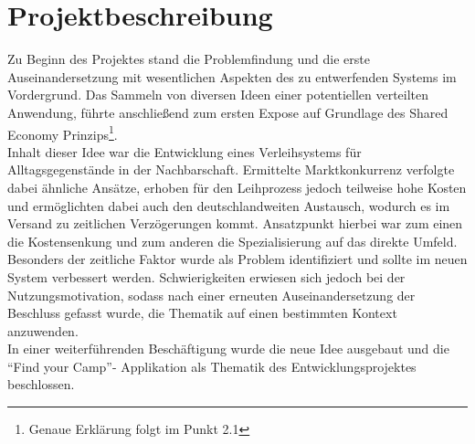
\chapter{Projektbeschreibung}

Zu Beginn des Projektes stand die Problemfindung und die erste Auseinandersetzung mit wesentlichen Aspekten des zu entwerfenden Systems im Vordergrund. Das Sammeln von diversen Ideen einer potentiellen verteilten Anwendung, führte anschließend zum ersten Expose auf Grundlage des Shared Economy Prinzips\footnote{Genaue Erklärung folgt im Punkt 2.1}.\\
Inhalt dieser Idee war die Entwicklung eines Verleihsystems für Alltagsgegenstände in der Nachbarschaft. Ermittelte Marktkonkurrenz verfolgte dabei ähnliche Ansätze, erhoben für den Leihprozess jedoch teilweise hohe Kosten und ermöglichten dabei auch den deutschlandweiten Austausch, wodurch es im Versand zu zeitlichen Verzögerungen kommt.
Ansatzpunkt hierbei war zum einen die Kostensenkung und zum anderen die Spezialisierung auf das direkte Umfeld. Besonders der zeitliche Faktor wurde als Problem identifiziert und sollte im neuen System verbessert werden. Schwierigkeiten erwiesen sich jedoch bei der Nutzungsmotivation, sodass nach einer erneuten Auseinandersetzung der Beschluss gefasst wurde, die Thematik auf einen bestimmten Kontext anzuwenden.\\   
In einer weiterführenden Beschäftigung wurde die neue Idee ausgebaut und die “Find your Camp”- Applikation als Thematik des Entwicklungsprojektes beschlossen. 



\newpage



\newpage






\newpage




